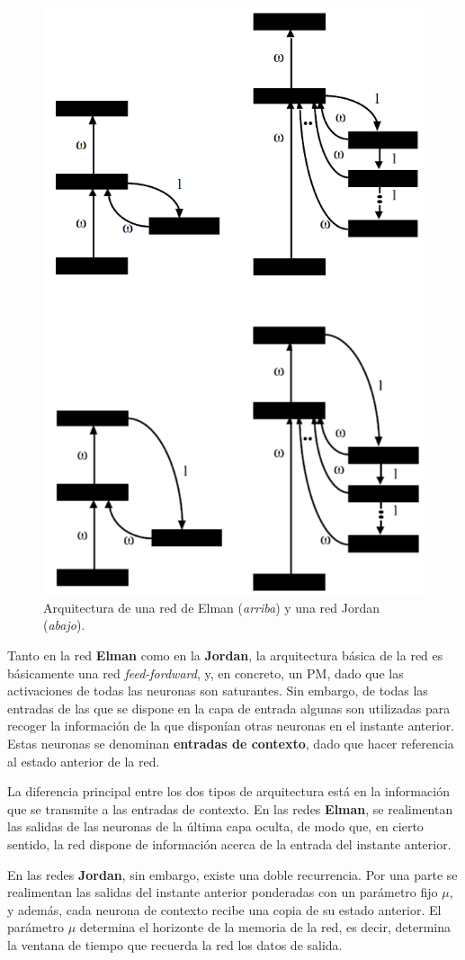 \documentclass[10pt,a4paper]{article}
\begin{document}
\begin{figure}
  \label{fig:elman_jordan}
  \caption{Arquitectura de una red de Elman (\textit{arriba}) y una red Jordan (\textit{abajo}).}
  \centering
  \hbox{\includegraphics[width=0.45\textwidth-\fboxrule-\fboxrule]{elman_jordan.png}}  
\end{figure}	

Tanto en la red \textbf{Elman} como en la \textbf{Jordan}, la arquitectura básica de la red es básicamente una red \textit{feed-fordward}, y, en concreto, un PM, dado que las activaciones de todas las neuronas son saturantes. Sin embargo, de todas las entradas de las que se dispone en la capa de entrada algunas son utilizadas para recoger la información de la que disponían otras neuronas en el instante anterior. Estas neuronas se denominan \textbf{entradas de contexto}, dado que hacer referencia al estado anterior de la red.

La diferencia principal entre los dos tipos de arquitectura está en la información que se transmite a las entradas de contexto. En las redes \textbf{Elman}, se realimentan las salidas de las neuronas de la última capa oculta, de modo que, en cierto sentido, la red dispone de información acerca de la entrada del instante anterior.

En las redes \textbf{Jordan}, sin embargo, existe una doble recurrencia. Por una parte se realimentan las salidas del instante anterior ponderadas con un parámetro fijo $\mu$, y además, cada neurona de contexto recibe una copia de su estado anterior. El parámetro $\mu$ determina el horizonte de la memoria de la red, es decir, determina la ventana de tiempo que recuerda la red los datos de salida.
\end{document}
